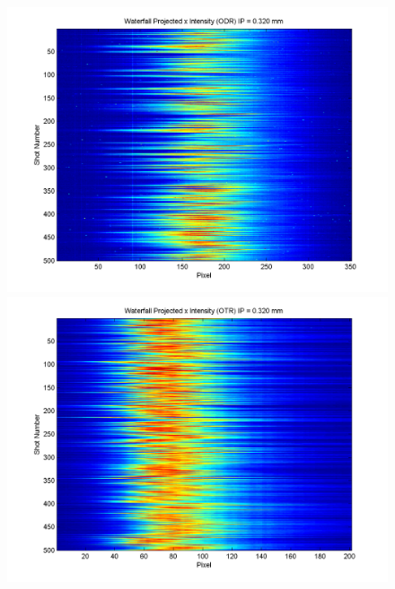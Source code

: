 \documentclass[12pt]{article}
\begin{document}
\begin{figure}
\begin{center}
\includegraphics[scale=0.5]{Figures/ProjX_wfall_ODR_320.PNG}
\includegraphics[scale=0.5]{Figures/ProjX_wfall_OTR_320.PNG}
\caption{}
\end{center}
\end{figure}
\end{document}
